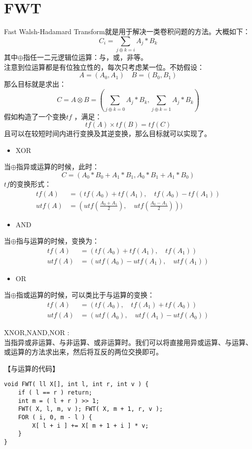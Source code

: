 \section{FWT}
Fast Walsh-Hadamard Transform就是用于解决一类卷积问题的方法。大概如下：
$$
C_i=\sum_{j\oplus k=i}A_j*B_k
$$
其中$\oplus$指任一二元逻辑位运算：与，或，非等。\\
注意到位运算都是有位独立性的，每次只考虑某一位。不妨假设：
$$
A=(A_0,A_1)\quad B=(B_0, B_1)
$$
那么目标就是求出：
$$
C=A\otimes B=(\sum_{j\oplus k=0}A_j*B_k,\sum_{j\oplus k=1}A_j*B_k)
$$
假如构造了一个变换$tf$ ，满足：
$$
tf(A)\times tf(B)=tf(C)
$$
且可以在较短时间内进行变换及其逆变换，那么目标就可以实现了。
\begin{itemize}
  \item XOR
\end{itemize}
当$\oplus$指异或运算的时候，此时：
$$
C=(A_0*B_0+A_1*B_1,A_0*B_1+A_1*B_0)
$$
$tf$的变换形式：
$$
\begin{aligned}
tf(A)&=(tf(A_0)+tf(A_1),\quad tf(A_0)-tf(A_1)) \\
utf(A)&=(utf(\frac{A_0+A_1}{2}),\quad utf(\frac{A_0-A_1}{2})))
\end{aligned}
$$

\begin{itemize}
  \item AND
\end{itemize}

当$\oplus$指与运算的时候，变换为：
$$
\begin{aligned}
tf(A)&=(tf(A_0)+tf(A_1),\quad tf(A_1)) \\
utf(A)&=(utf(A_0) - utf(A_1),\quad utf(A_1))
\end{aligned}
$$

\begin{itemize}
  \item OR
\end{itemize}

当$\oplus$指或运算的时候，可以类比于与运算的变换：
$$
\begin{aligned}
tf(A)&=(tf(A_0),\quad tf(A_1)+tf(A_0)) \\
utf(A)&=(utf(A_0),\quad utf(A_1)-utf(A_0))
\end{aligned}
$$

XNOR,NAND,NOR : \\
当指异或非运算、与非运算、或非运算时。我们可以将直接用异或运算、与运算、或运算的方法求出来，然后将互反的两位交换即可。

【与运算的代码】
\begin{lstlisting}
void FWT( ll X[], int l, int r, int v ) {
    if ( l == r ) return;
    int m = ( l + r ) >> 1;
    FWT( X, l, m, v ); FWT( X, m + 1, r, v );
    FOR ( i, 0, m - l ) {
        X[ l + i ] += X[ m + 1 + i ] * v;
    }
}
\end{lstlisting}

